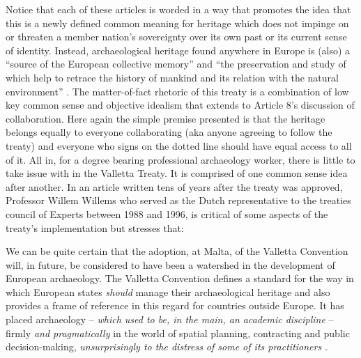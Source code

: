 \documentclass[english]{ijsra}
\begin{document}
Notice that each of these articles is worded in a way that promotes the idea that this is a newly defined common meaning for heritage which does not impinge on or threaten a member nation’s sovereignty over its own past or its current sense of identity. Instead, archaeological heritage found anywhere in Europe is (also) a “source of the European collective memory” and “the preservation and study of which help to retrace the history of mankind and its relation with the natural environment” \parencite[4]{Valletta_1992}. 
The matter-of-fact rhetoric of this treaty is a combination of low key common sense and objective idealism that extends to Article 8’s discussion of collaboration. Here again the simple premise presented is that the heritage belongs equally to everyone collaborating (aka anyone agreeing to follow the treaty) and everyone who signs on the dotted line should have equal access to all of it. All in, for a degree bearing professional archaeology worker, there is little to take issue with in the Valletta Treaty. It is comprised of one common sense idea after another. In an article written tens of years after the treaty was approved, Professor Willem Willems who served as the Dutch representative to the treaties council of Experts between 1988 and 1996, is critical of some aspects of the treaty’s implementation but stresses that:

\begin{displayquote}
	We can be quite certain that the adoption, at Malta, of the Valletta Convention will, in future, be considered to have been a watershed in the development of European archaeology. The Valletta Convention defines a standard for the way in which European states \textit{should} manage their archaeological heritage and also provides a frame of reference in this regard for countries outside Europe. It has placed archaeology – \textit{which used to be, in the main, an academic discipline} – firmly {\textit{and pragmatically}} in the world of spatial planning, contracting and public decision-making, \textit{unsurprisingly to the distress of some of its practitioners} \parencite{Willems_2007}.
\end{displayquote}
\end{document}
